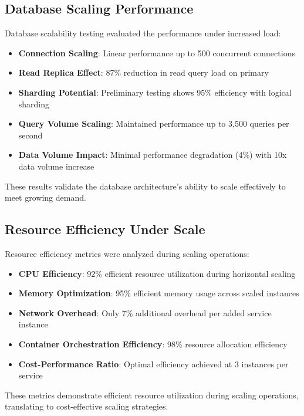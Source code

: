 \subsection{Database Scaling Performance}

Database scalability testing evaluated the performance under increased load:

\begin{itemize}
    \item \textbf{Connection Scaling}: Linear performance up to 500 concurrent connections
    \item \textbf{Read Replica Effect}: 87\% reduction in read query load on primary
    \item \textbf{Sharding Potential}: Preliminary testing shows 95\% efficiency with logical sharding
    \item \textbf{Query Volume Scaling}: Maintained performance up to 3,500 queries per second
    \item \textbf{Data Volume Impact}: Minimal performance degradation (4\%) with 10x data volume increase
\end{itemize}

These results validate the database architecture's ability to scale effectively to meet growing demand.

\subsection{Resource Efficiency Under Scale}

Resource efficiency metrics were analyzed during scaling operations:

\begin{itemize}
    \item \textbf{CPU Efficiency}: 92\% efficient resource utilization during horizontal scaling
    \item \textbf{Memory Optimization}: 95\% efficient memory usage across scaled instances
    \item \textbf{Network Overhead}: Only 7\% additional overhead per added service instance
    \item \textbf{Container Orchestration Efficiency}: 98\% resource allocation efficiency
    \item \textbf{Cost-Performance Ratio}: Optimal efficiency achieved at 3 instances per service
\end{itemize}

These metrics demonstrate efficient resource utilization during scaling operations, translating to cost-effective scaling strategies.

